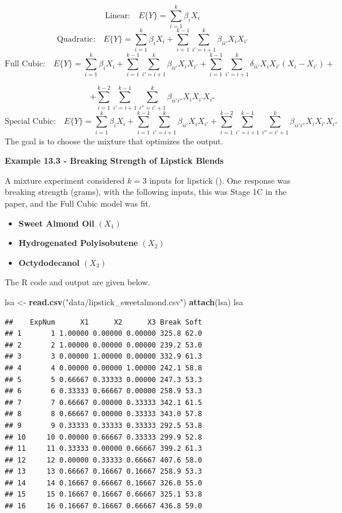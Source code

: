 \documentclass[
]{book}
\newenvironment{Shaded}{\begin{snugshade}}{\end{snugshade}}
\newcommand{\FunctionTok}[1]{\textcolor[rgb]{0.13,0.29,0.53}{\textbf{#1}}}
\newcommand{\NormalTok}[1]{#1}
\newcommand{\OtherTok}[1]{\textcolor[rgb]{0.56,0.35,0.01}{#1}}
\newcommand{\StringTok}[1]{\textcolor[rgb]{0.31,0.60,0.02}{#1}}
\providecommand{\tightlist}{%
  \setlength{\itemsep}{0pt}\setlength{\parskip}{0pt}}
\begin{document}
\[
\mbox{Linear:} \quad E\{Y\}=\sum_{i=1}^k \beta_iX_i 
\] \[
\mbox{Quadratic:} \quad  E\{Y\}=\sum_{i=1}^k \beta_iX_i + 
\sum_{i=1}^{k-1}\sum_{i'=i+1}^k \beta_{ii'}X_iX_{i'}
\] \[
\mbox{Full Cubic:} \quad
E\{Y\}=\sum_{i=1}^k \beta_iX_i + 
\sum_{i=1}^{k-1}\sum_{i'=i+1}^k \beta_{ii'}X_iX_{i'} 
+ \sum_{i=1}^{k-1}\sum_{i'=i+1}^k\delta_{ii'}X_iX_{i'}\left(X_i-X_{i'}\right) + \]

\[ + \sum_{i=1}^{k-2}\sum_{i'=i+1}^{k-1}\sum_{i''=i'+1}^k\beta_{ii'i''}X_iX_{i'}X_{i''}
\] \[
\mbox{Special Cubic:} \quad
E\{Y\}=\sum_{i=1}^k \beta_iX_i + 
\sum_{i=1}^{k-1}\sum_{i'=i+1}^k \beta_{ii'}X_iX_{i'} +
\sum_{i=1}^{k-2}\sum_{i'=i+1}^{k-1}\sum_{i''=i'+1}^k\beta_{ii'i''}X_iX_{i'}X_{i''}
\] The goal is to choose the mixture that optimizes the output.

\textbf{Example 13.3 - Breaking Strength of Lipstick Blends}

A mixture experiment considered \(k=3\) inputs for lipstick
(). One
response was breaking strength (grams), with the following inputs, this
was Stage 1C in the paper, and the Full Cubic model was fit.

\begin{itemize}
\tightlist
\item
  \textbf{Sweet Almond Oil} \((X_1)\)
\item
  \textbf{Hydrogenated Polyisobutene} \((X_2)\)
\item
  \textbf{Octydodecanol} \((X_3)\)
\end{itemize}

The R code and output are given below.

\begin{Shaded}
\begin{Highlighting}[]
\NormalTok{lsa }\OtherTok{\textless{}{-}} \FunctionTok{read.csv}\NormalTok{(}\StringTok{"data/lipstick\_sweetalmond.csv"}\NormalTok{)}
\FunctionTok{attach}\NormalTok{(lsa)}
\NormalTok{lsa}
\end{Highlighting}
\end{Shaded}

\begin{verbatim}
##    ExpNum      X1      X2      X3 Break Soft
## 1       1 1.00000 0.00000 0.00000 325.8 62.0
## 2       2 1.00000 0.00000 0.00000 239.2 53.0
## 3       3 0.00000 1.00000 0.00000 332.9 61.3
## 4       4 0.00000 0.00000 1.00000 242.1 58.8
## 5       5 0.66667 0.33333 0.00000 247.3 53.3
## 6       6 0.33333 0.66667 0.00000 258.9 53.3
## 7       7 0.66667 0.00000 0.33333 342.1 61.5
## 8       8 0.66667 0.00000 0.33333 343.0 57.8
## 9       9 0.33333 0.33333 0.33333 292.5 53.8
## 10     10 0.00000 0.66667 0.33333 299.9 52.8
## 11     11 0.33333 0.00000 0.66667 399.2 61.3
## 12     12 0.00000 0.33333 0.66667 407.6 58.0
## 13     13 0.66667 0.16667 0.16667 258.9 53.3
## 14     14 0.16667 0.66667 0.16667 326.0 55.0
## 15     15 0.16667 0.16667 0.66667 325.1 53.8
## 16     16 0.16667 0.16667 0.66667 436.8 59.0
\end{verbatim}
\end{document}
